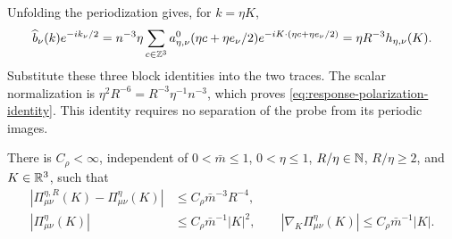 Unfolding the periodization gives, for $k=\eta K$,
\[
 \widehat b_\nu(k)e^{-ik_\nu/2}
     =n^{-3}\eta\sum_{c\in\mathbb Z^3}
          a_{\eta,\nu}^0(\eta c+\eta e_\nu/2)
                            e^{-iK\cdot(\eta c+\eta e_\nu/2)}
     =\eta R^{-3}h_{\eta,\nu}(K).
\]
Substitute these three block identities into the two traces.
The scalar normalization is
$\eta^2R^{-6}=R^{-3}\eta^{-1}n^{-3}$, which proves
\eqref{eq:response-polarization-identity}. This identity
requires no separation of the probe from its periodic images.

\begin{proposition}\label{prop:response-polarization-bounds}
There is $C_\rho<\infty$, independent of $0<\bar m\le1$,
$0<\eta\le1$, $R/\eta\in\mathbb N$, $R/\eta\ge2$, and $K\in\mathbb R^3$,
such that
\begin{align}
 |\Pi^{\eta,R}_{\mu\nu}(K)-\Pi^\eta_{\mu\nu}(K)|
       &\le C_\rho\bar m^{-3}R^{-4},
                            \label{eq:response-polarization-quadrature}\\
 |\Pi^\eta_{\mu\nu}(K)|&\le C_\rho\bar m^{-1}|K|^2,\qquad
 |\nabla_K\Pi^\eta_{\mu\nu}(K)|
                    \le C_\rho\bar m^{-1}|K|.
                            \label{eq:response-polarization-quadratic}
\end{align}
\end{proposition}

